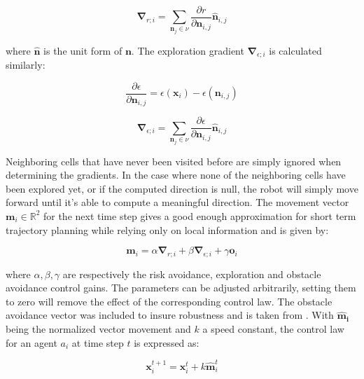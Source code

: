 \documentclass[letterpaper, 10 pt, conference]{ieeeconf}
\begin{document}
\begin{equation}
    \bm{\nabla}_{r;i} = \sum_{\bm{n}_j \in \nu}\frac{\partial r}{\partial \bm{n}_{i,j}} \bm{\hat{n}}_{i,j}
    \label{eq:gradient}
\end{equation}

where $\bm{\hat{n}}$ is the unit form of $\bm{n}$. The exploration
gradient $\bm{\nabla}_{\epsilon;i}$ is calculated similarly:


\begin{equation}
    \frac{\partial \epsilon}{\partial \bm{n}_{i,j}} = \epsilon(\bm{x}_i) - \epsilon(\bm{n}_{i,j})
    \label{eq:neighbor}
\end{equation}

\begin{equation}
    \bm{\nabla}_{\epsilon;i} = \sum_{\bm{n}_j \in \nu}\frac{\partial \epsilon}{\partial \bm{n}_{i,j}} \bm{\hat{n}}_{i,j}
    \label{eq:gradient}
\end{equation}

Neighboring cells that have never been visited before are simply ignored when determining the gradients. In the case where none of the neighboring cells have been explored yet, or if the computed direction is null, the robot will simply move forward until it's able to compute a meaningful direction. The movement vector $\bm{m}_i \in \mathbb{R}^2$ for the next time step
gives a good enough approximation for short term trajectory planning
while relying only on local information and is given by:

\begin{equation}
    \bm{m}_i = \alpha\bm{\nabla}_{r;i} + \beta\bm{\nabla}_{\epsilon;i} + \gamma\bm{o}_i
    \label{eq:movement}
\end{equation}

where $\alpha, \beta, \gamma$ are respectively the risk avoidance,
exploration and obstacle avoidance control gains. The parameters can
be adjusted arbitrarily, setting them to zero will remove the effect
of the corresponding control law. The obstacle avoidance vector was
included to insure robustness and is taken from
\cite{shahriari2018lightweight}. With $\bm{\hat{m}_i}$ being the
normalized vector movement and $k$ a speed constant, the control law
for an agent $a_i$ at time step $t$ is expressed as:

\begin{equation}
    \bm{x}_i^{t+1} = \bm{x}_i^t + k \bm{\hat{m}}_i^t
    \label{eq:control}
\end{equation}
\end{document}
